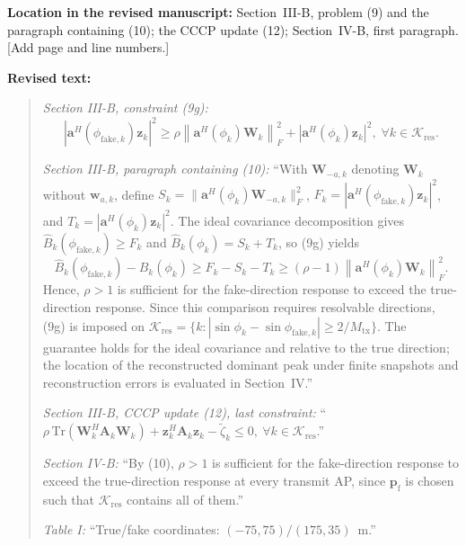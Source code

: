 \documentclass[a4paper,12pt]{article}
\newcommand{\revisionlocation}[1]{\par\textbf{Location in the revised manuscript:} #1\par}
\newenvironment{revisedtext}{%
  \par\textbf{Revised text:}\begin{quote}\color{red}
}{\end{quote}}
\begin{document}
\revisionlocation{Section~III-B, problem (9) and the paragraph containing
(10); the CCCP update (12); Section~IV-B, first paragraph. [Add page and line
numbers.]}
\begin{revisedtext}
\textit{Section III-B, constraint (9g):}
\begin{equation*}
\left|\mathbf{a}^H(\phi_{\mathrm{fake},k})\mathbf{z}_k\right|^2
\ge\rho\left\|\mathbf{a}^H(\phi_k)\mathbf{W}_k\right\|_F^2
+\left|\mathbf{a}^H(\phi_k)\mathbf{z}_k\right|^2,\;\forall k\in\mathcal{K}_{\mathrm{res}}.
\end{equation*}

\textit{Section III-B, paragraph containing (10):} ``With $\mathbf{W}_{-a,k}$
denoting $\mathbf{W}_k$ without $\mathbf{w}_{a,k}$, define
$S_k=\|\mathbf{a}^H(\phi_k)\mathbf{W}_{-a,k}\|_F^2$,
$F_k=|\mathbf{a}^H(\phi_{\mathrm{fake},k})\mathbf{z}_k|^2$, and
$T_k=|\mathbf{a}^H(\phi_k)\mathbf{z}_k|^2$. The ideal covariance
decomposition gives $\widehat{B}_k(\phi_{\mathrm{fake},k})\ge F_k$ and
$\widehat{B}_k(\phi_k)=S_k+T_k$, so (9g) yields
\begin{equation*}
\widehat{B}_k(\phi_{\mathrm{fake},k})-\widehat{B}_k(\phi_k)
\ge F_k-S_k-T_k
\ge(\rho-1)\left\|\mathbf{a}^H(\phi_k)\mathbf{W}_k\right\|_F^2.
\end{equation*}
Hence, $\rho>1$ is sufficient for the fake-direction response to exceed the
true-direction response. Since this comparison requires resolvable
directions, (9g) is imposed on
$\mathcal{K}_{\mathrm{res}}=\{k:|\sin\phi_k-\sin\phi_{\mathrm{fake},k}|\ge2/M_{\mathrm{tx}}\}$.
The guarantee holds for the ideal covariance and relative to the true
direction; the location of the reconstructed dominant peak under finite
snapshots and reconstruction errors is evaluated in Section~IV.''

\textit{Section III-B, CCCP update (12), last constraint:}
``$\rho\,\mathrm{Tr}(\mathbf{W}_k^H\mathbf{A}_k\mathbf{W}_k)
+\mathbf{z}_k^H\mathbf{A}_k\mathbf{z}_k-\widetilde{\zeta}_k\le0,\
\forall k\in\mathcal{K}_{\mathrm{res}}$.''

\textit{Section IV-B:} ``By (10), $\rho>1$ is sufficient for the
fake-direction response to exceed the true-direction response at every
transmit AP, since $\mathbf{p}_{\mathrm{f}}$ is chosen such that
$\mathcal{K}_{\mathrm{res}}$ contains all of them.''

\textit{Table I:} ``True/fake coordinates: $(-75,75)/(175,35)$~m.''
\end{revisedtext}
\end{document}
